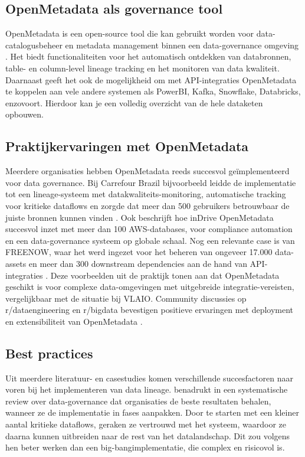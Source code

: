 \subsection{OpenMetadata als governance tool}

OpenMetadata is een open-source tool die kan gebruikt worden voor data-catalogusbeheer en metadata management binnen een data-governance omgeving \autocite{OpenMetadataDocs2024}. Het biedt functionaliteiten voor het automatisch ontdekken van databronnen, table- en column-level lineage tracking en het monitoren van data kwaliteit. Daarnaast geeft het ook de mogelijkheid om met API-integraties OpenMetadata te koppelen aan vele andere systemen als PowerBI, Kafka, Snowflake, Databricks, enzovoort. Hierdoor kan je een volledig overzicht van de hele dataketen opbouwen. 

\subsection{Praktijkervaringen met OpenMetadata}

Meerdere organisaties hebben OpenMetadata reeds succesvol geïmplementeerd voor data governance. Bij Carrefour Brazil bijvoorbeeld leidde de implementatie tot een lineage-systeem met datakwaliteits-monitoring, automatische tracking voor kritieke dataflows en zorgde dat meer dan 500 gebruikers betrouwbaar de juiste bronnen kunnen vinden \autocite{OpenMetadataCarrefour2024}. Ook \autocite{OpenMetadataIndrive2024} beschrijft hoe inDrive OpenMetadata succesvol inzet met meer dan 100 AWS-databases, voor compliance automation en een data-governance systeem op globale schaal. Nog een relevante case is van FREENOW, waar het werd ingezet voor het beheren van ongeveer 17.000 data-assets en meer dan 300 downstream dependencies aan de hand van API-integraties \autocite{OpenMetadataFreenow2024}. Deze voorbeelden uit de praktijk tonen aan dat OpenMetadata geschikt is voor complexe data-omgevingen met uitgebreide integratie-vereisten, vergelijkbaar met de situatie bij VLAIO.
Community discussies op r/dataengineering en r/bigdata bevestigen positieve ervaringen met deployment en extensibiliteit van OpenMetadata \autocite{RedditCommunities2025}.
 

\subsection{Best practices}

Uit meerdere literatuur- en casestudies komen verschillende succesfactoren naar voren bij het implementeren van data lineage. \autocite{bernardo2024data} benadrukt in een systematische review over data-governance dat organisaties de beste resultaten behalen, wanneer ze de implementatie in fases aanpakken. Door te starten met een kleiner aantal kritieke dataflows, geraken ze vertrouwd met het systeem, waardoor ze daarna kunnen uitbreiden naar de rest van het datalandschap. Dit zou volgens hen beter werken dan een big-bangimplementatie, die complex en risicovol is.  

